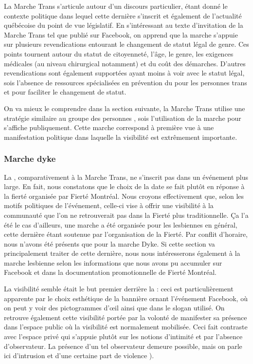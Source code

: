 La Marche Trans s'articule autour d'un discours particulier, étant donné le contexte politique dans lequel cette dernière s'inscrit et également de l'actualité québécoise du point de vue législatif. 
En s'intéressant au texte d'invitation de la Marche Trans tel que publié sur Facebook, on apprend que la marche s'appuie sur plusieurs revendications entourant le changement de statut légal de genre. 
Ces points tournent autour du statut de citoyenneté, l'âge, le genre, les exigences médicales (au niveau chirurgical notamment) et du coût des démarches. 
D'autres revendications sont également supportées ayant moins à voir avec le statut légal, sois l'absence de ressources spécialisées en prévention du \vih{} pour les personnes trans et pour faciliter le changement de statut.

On va mieux le comprendre dans la section suivante, la Marche Trans utilise une stratégie similaire au groupe des personnes \dyke{}, sois l'utilisation de la marche pour s'affiche publiquement. 
Cette marche correspond à première vue à une manifestation politique dans laquelle la visibilité est extrêmement importante.

\subsubsection{Marche dyke}
\label{subsubsec:marchedyke}
La \dm{}, comparativement à la Marche Trans, ne s'inscrit pas dans un événement plus large. 
En fait, nous constatons que le choix de la date se fait plutôt en réponse à la fierté organisée par Fierté Montréal. 
Nous croyons effectivement que, selon les motifs politiques de l'événement, celle-ci vise à offrir une visibilité à la communauté \dyke{} que l'on ne retrouverait pas dans la Fierté plus traditionnelle. Ça l'a été le cas d'ailleurs, une marche a été organisée pour les lesbiennes en général, cette dernière étant soutenue par l'organisation de la Fierté. 
Par conflit d'horaire, nous n'avons été présents que pour la marche Dyke. 
Si cette section va principalement traiter de cette dernière, nous nous intéresserons également à la marche lesbienne selon les informations que nous avons pu accumuler sur Facebook et dans la documentation promotionnelle de Fierté Montréal.

La visibilité semble était le but premier derrière la \dm{}: ceci est particulièrement apparente par le choix esthétique de la bannière ornant l'événement Facebook, où on peut y voir des pictogrammes d'œil ainsi que dans le slogan utilisé. 
On retrouve également cette visibilité portée par la volonté de manifester sa présence dans l'espace public où la visibilité est normalement mobilisée. 
Ceci fait contraste avec l'espace privé qui s'appuie plutôt sur les notions d'intimité et par l'absence d'observateur. 
La présence d'un tel observateur demeure possible, mais on parle  ici d'intrusion et d'une certaine part de violence ). 

